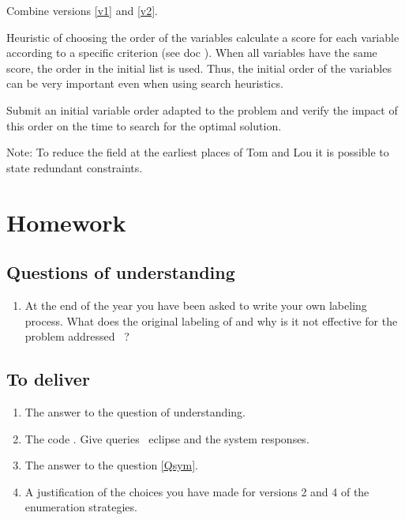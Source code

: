 \begin{version}
Combine versions \ref{v1} and \ref{v2}.
\end{version}

\begin{version}
Heuristic of choosing the order of the variables calculate a score for each variable according to a specific criterion (see doc ).
When all variables have the same score, the order in the initial list is used.
Thus, the initial order of the variables can be very important even when using search heuristics.


Submit an initial variable order adapted to the problem and verify the impact of this order on the time to search for the optimal solution.
\end{version}

Note: To reduce the field at the earliest places of Tom and Lou it is possible to state redundant constraints.

\section{Homework}

\subsection{Questions of understanding}

\begin{enumerate}

\item At the end of the year you have been asked to write your own labeling process. What does the original labeling of \eclipse{} and why is it not effective for the problem addressed ~?

\end{enumerate}

\subsection{To deliver}

\begin{enumerate}
\item The answer to the question of understanding.
\item The code \eclipse{}. Give queries \ eclipse {} and the system responses.
\item The answer to the question \ref{Qsym}.
\item A justification of the choices you have made for versions 2 and 4 of the enumeration strategies.
\end{enumerate}

